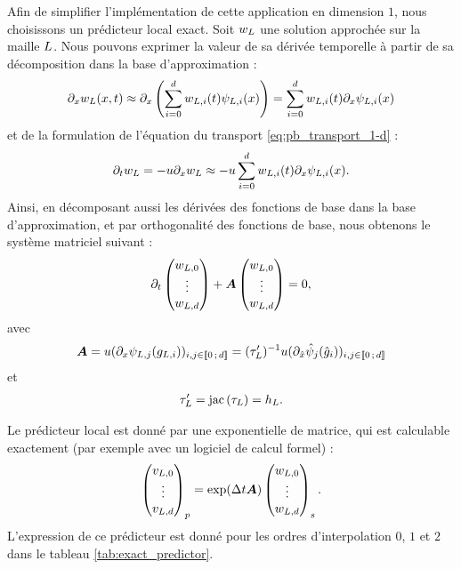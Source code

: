 Afin de simplifier l'implémentation de cette application en dimension $1$,
nous choisissons un prédicteur local exact.
Soit $w_L$ une solution approchée sur la maille $L$.
Nous pouvons exprimer la valeur de sa dérivée temporelle à partir
de sa décomposition dans la base d'approximation :
\begin{align}
	\partial_{x} w_L (x,t) \approx 
	\partial_{x} \left( \sum_{i=0}^{d} w_{L,i}(t) \psi_{L,i}(x) \right) =
	\sum_{i=0}^{d} w_{L,i}(t) \partial_{x} \psi_{L,i}(x)
\end{align}
et de la formulation de l'équation du transport \eqref{eq:pb_transport_1-d} :
\begin{align}
	\partial_{t} w_L = - u \partial_{x} w_L \approx
	- u \sum_{i=0}^{d} w_{L,i}(t) \partial_{x} \psi_{L,i}(x) .
\end{align}
Ainsi, en décomposant aussi les dérivées des fonctions de base dans la
base d'approximation, et par orthogonalité des fonctions de base,
nous obtenons le système matriciel suivant :
\begin{align}
	\partial_{t} \begin{pmatrix}
		w_{L,0} \\
		\vdots \\
		w_{L,d}
	\end{pmatrix} + \bm{A}
	\begin{pmatrix}
		w_{L,0} \\
		\vdots \\
		w_{L,d}
	\end{pmatrix}
	= 0 ,
\end{align}
avec
\begin{align}
	\bm{A} = u (\partial_{x} \psi_{L,j} (g_{L,i}))_{i,j \in \lbrack\!\lbrack0\,;\,d\rbrack\!\rbrack} =
	(\tau_{L}')^{-1} u (\partial_{\hat{x}} \hat{\psi}_{j} (\hat{g}_{i}))_{i,j \in \lbrack\!\lbrack0\,;\,d\rbrack\!\rbrack}
\end{align}
et
\begin{align}
	\tau_{L}' = \mathrm{jac}\left(\tau_{L}\right) = h_L.
\end{align}

Le prédicteur local est donné par une exponentielle de matrice, qui est calculable exactement (par exemple
avec un logiciel de calcul formel) :
\begin{align}
	\begin{pmatrix}
		v_{L,0} \\
		\vdots \\
		v_{L,d}
	\end{pmatrix}_p =
	\mathrm{exp} ( \Delta t \bm{A} )
	\begin{pmatrix}
		w_{L,0} \\
		\vdots \\
		w_{L,d}
	\end{pmatrix}_s .
\end{align}
L'expression de ce prédicteur est donné pour les ordres d'interpolation
$0$, $1$ et $2$ dans le tableau \ref{tab:exact_predictor}.

